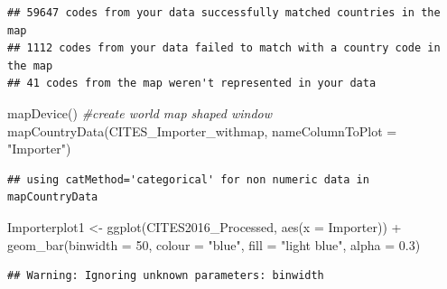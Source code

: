 \documentclass[
  12pt,
]{article}
\newenvironment{Shaded}{\begin{snugshade}}{\end{snugshade}}
\newcommand{\AttributeTok}[1]{\textcolor[rgb]{0.77,0.63,0.00}{#1}}
\newcommand{\CommentTok}[1]{\textcolor[rgb]{0.56,0.35,0.01}{\textit{#1}}}
\newcommand{\DecValTok}[1]{\textcolor[rgb]{0.00,0.00,0.81}{#1}}
\newcommand{\FloatTok}[1]{\textcolor[rgb]{0.00,0.00,0.81}{#1}}
\newcommand{\FunctionTok}[1]{\textcolor[rgb]{0.00,0.00,0.00}{#1}}
\newcommand{\NormalTok}[1]{#1}
\newcommand{\OtherTok}[1]{\textcolor[rgb]{0.56,0.35,0.01}{#1}}
\newcommand{\SpecialCharTok}[1]{\textcolor[rgb]{0.00,0.00,0.00}{#1}}
\newcommand{\StringTok}[1]{\textcolor[rgb]{0.31,0.60,0.02}{#1}}
\begin{document}
\begin{verbatim}
## 59647 codes from your data successfully matched countries in the map
## 1112 codes from your data failed to match with a country code in the map
## 41 codes from the map weren't represented in your data
\end{verbatim}

\begin{Shaded}
\begin{Highlighting}[]
\FunctionTok{mapDevice}\NormalTok{()  }\CommentTok{\#create world map shaped window}
\FunctionTok{mapCountryData}\NormalTok{(CITES\_Importer\_withmap, }\AttributeTok{nameColumnToPlot =} \StringTok{"Importer"}\NormalTok{)}
\end{Highlighting}
\end{Shaded}

\begin{verbatim}
## using catMethod='categorical' for non numeric data in mapCountryData
\end{verbatim}

\begin{Shaded}
\begin{Highlighting}[]
\NormalTok{Importerplot1 }\OtherTok{\textless{}{-}} \FunctionTok{ggplot}\NormalTok{(CITES2016\_Processed, }\FunctionTok{aes}\NormalTok{(}\AttributeTok{x =}\NormalTok{ Importer)) }\SpecialCharTok{+} \FunctionTok{geom\_bar}\NormalTok{(}\AttributeTok{binwidth =} \DecValTok{50}\NormalTok{,}
    \AttributeTok{colour =} \StringTok{"blue"}\NormalTok{, }\AttributeTok{fill =} \StringTok{"light blue"}\NormalTok{, }\AttributeTok{alpha =} \FloatTok{0.3}\NormalTok{)}
\end{Highlighting}
\end{Shaded}

\begin{verbatim}
## Warning: Ignoring unknown parameters: binwidth
\end{verbatim}

\begin{Shaded}
\end{Shaded}
\end{document}
